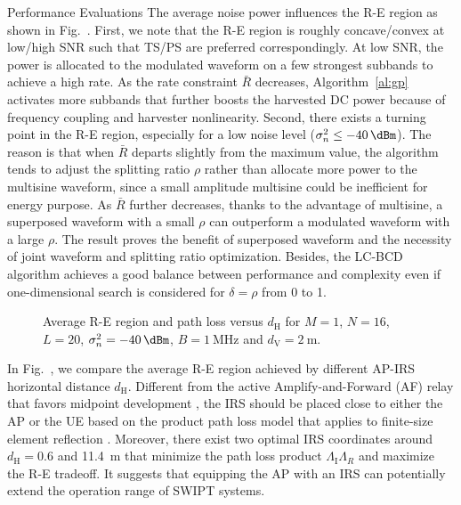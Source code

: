 \documentclass[journal]{IEEEtran}
\begin{document}
\begin{section}{Performance Evaluations}
		The average noise power influences the R-E region as shown in Fig.~. First, we note that the R-E region is roughly concave/convex at low/high SNR such that TS/PS are preferred correspondingly. At low SNR, the power is allocated to the modulated waveform on a few strongest subbands to achieve a high rate. As the rate constraint $\bar{R}$ decreases, Algorithm~\ref{al:gp} activates more subbands that further boosts the harvested DC power because of frequency coupling and harvester nonlinearity. Second, there exists a turning point in the R-E region, especially for a low noise level ($\sigma_n^2 \le \SI{-40}{\dBm}$). The reason is that when $\bar{R}$ departs slightly from the maximum value, the algorithm tends to adjust the splitting ratio $\rho$ rather than allocate more power to the multisine waveform, since a small amplitude multisine could be inefficient for energy purpose. As $\bar{R}$ further decreases, thanks to the advantage of multisine, a superposed waveform with a small $\rho$ can outperform a modulated waveform with a large $\rho$. The result proves the benefit of superposed waveform and the necessity of joint waveform and splitting ratio optimization. Besides, the LC-BCD algorithm achieves a good balance between performance and complexity even if one-dimensional search is considered for $\delta=\rho$ from \num{0} to \num{1}.

		\begin{figure}[!t]
			\centering
			\caption{Average R-E region and path loss versus $d_{\mathrm{H}}$ for $M=1$, $N=16$, $L=20$, $\sigma_n^2=\SI{-40}{\dBm}$, $B=\SI{1}{\MHz}$ and $d_{\mathrm{V}}=\SI{2}{\meter}$.}
		\end{figure}

		In Fig.~, we compare the average R-E region achieved by different AP-IRS horizontal distance $d_{\mathrm{H}}$. Different from the active Amplify-and-Forward (AF) relay that favors midpoint development \cite{Li2017}, the IRS should be placed close to either the AP or the UE based on the product path loss model that applies to finite-size element reflection \cite{Ozdogan2020,Tang2021}. Moreover, there exist two optimal IRS coordinates around $d_{\mathrm{H}}=0.6$ and \SI{11.4}{\meter} that minimize the path loss product $\Lambda_{\mathrm{I}}\Lambda_R$ and maximize the R-E tradeoff. It suggests that equipping the AP with an IRS can potentially extend the operation range of SWIPT systems.


\end{section}
\end{document}
